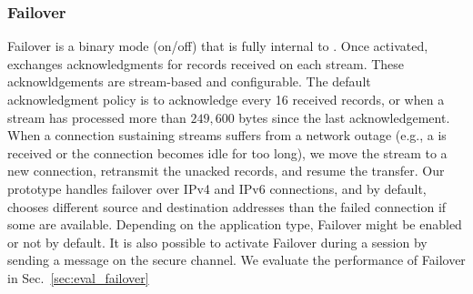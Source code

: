 \subsubsection{Failover}\label{failover}
Failover is a binary mode (on/off) that is fully internal to \tcpls.
Once activated, \tcpls exchanges acknowledgments for records received on each stream. These acknowldgements are stream-based and configurable. The default acknowledgment policy is to acknowledge every 16 received records, or when a stream has processed more than $249,600$ bytes since the last acknowledgement. When a \tcp connection sustaining \tcpls streams suffers from a network outage (e.g., a \rst is received or the connection becomes idle for too long), we move the stream to a new \tcp connection, retransmit the unacked records, and resume the transfer. Our prototype handles failover over IPv4 and IPv6 \tcp connections, and by default, chooses different source and destination addresses than the failed \tcp connection if some are available.
Depending on the application type, Failover might be enabled or not by default. It is also possible to activate Failover during a \tcpls session by sending a message on the secure channel. We evaluate the performance of Failover in Sec.~\ref{sec:eval_failover}





